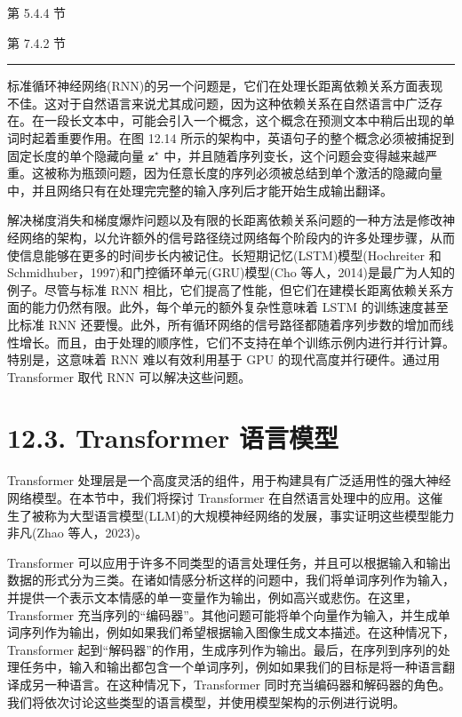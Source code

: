 \documentclass[10pt]{report}
\newcommand{\HRule}{\begin{center}\rule{0.9\linewidth}{0.2mm}\end{center}}
\begin{document}
第 5.4.4 节

第 7.4.2 节

\HRule

标准循环神经网络(RNN)的另一个问题是，它们在处理长距离依赖关系方面表现不佳。这对于自然语言来说尤其成问题，因为这种依赖关系在自然语言中广泛存在。在一段长文本中，可能会引入一个概念，这个概念在预测文本中稍后出现的单词时起着重要作用。在图 12.14 所示的架构中，英语句子的整个概念必须被捕捉到固定长度的单个隐藏向量 \({\mathbf{z}}^{ \star  }\) 中，并且随着序列变长，这个问题会变得越来越严重。这被称为瓶颈问题，因为任意长度的序列必须被总结到单个激活的隐藏向量中，并且网络只有在处理完完整的输入序列后才能开始生成输出翻译。

解决梯度消失和梯度爆炸问题以及有限的长距离依赖关系问题的一种方法是修改神经网络的架构，以允许额外的信号路径绕过网络每个阶段内的许多处理步骤，从而使信息能够在更多的时间步长内被记住。长短期记忆(LSTM)模型(Hochreiter 和 Schmidhuber，1997)和门控循环单元(GRU)模型(Cho 等人，2014)是最广为人知的例子。尽管与标准 RNN 相比，它们提高了性能，但它们在建模长距离依赖关系方面的能力仍然有限。此外，每个单元的额外复杂性意味着 LSTM 的训练速度甚至比标准 RNN 还要慢。此外，所有循环网络的信号路径都随着序列步数的增加而线性增长。而且，由于处理的顺序性，它们不支持在单个训练示例内进行并行计算。特别是，这意味着 RNN 难以有效利用基于 GPU 的现代高度并行硬件。通过用 Transformer 取代 RNN 可以解决这些问题。

\section*{12.3. Transformer 语言模型}

Transformer 处理层是一个高度灵活的组件，用于构建具有广泛适用性的强大神经网络模型。在本节中，我们将探讨 Transformer 在自然语言处理中的应用。这催生了被称为大型语言模型(LLM)的大规模神经网络的发展，事实证明这些模型能力非凡(Zhao 等人，2023)。

Transformer 可以应用于许多不同类型的语言处理任务，并且可以根据输入和输出数据的形式分为三类。在诸如情感分析这样的问题中，我们将单词序列作为输入，并提供一个表示文本情感的单一变量作为输出，例如高兴或悲伤。在这里，Transformer 充当序列的“编码器”。其他问题可能将单个向量作为输入，并生成单词序列作为输出，例如如果我们希望根据输入图像生成文本描述。在这种情况下，Transformer 起到“解码器”的作用，生成序列作为输出。最后，在序列到序列的处理任务中，输入和输出都包含一个单词序列，例如如果我们的目标是将一种语言翻译成另一种语言。在这种情况下，Transformer 同时充当编码器和解码器的角色。我们将依次讨论这些类型的语言模型，并使用模型架构的示例进行说明。
\end{document}
